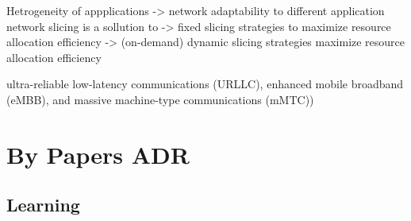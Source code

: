 \onecolumn
\setlength{\hoffset}{-.5in}

Hetrogeneity of appplications -> network adaptability to different application
network slicing is a sollution to 
-> fixed slicing strategies to maximize resource allocation efficiency
-> (on-demand) dynamic slicing strategies maximize resource allocation efficiency

ultra-reliable low-latency communications (URLLC), 
enhanced mobile broadband (eMBB),
and massive machine-type communications (mMTC))



\section{By Papers ADR}

\subsection{Learning}
